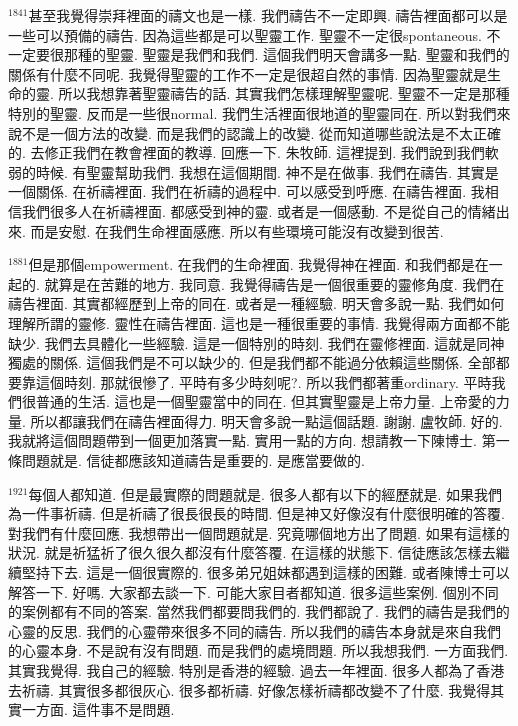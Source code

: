 \documentclass{book}
\begin{document}
$^{1841}$甚至我覺得崇拜裡面的禱文也是一樣.
我們禱告不一定即興.
禱告裡面都可以是一些可以預備的禱告.
因為這些都是可以聖靈工作.
聖靈不一定很spontaneous.
不一定要很那種的聖靈.
聖靈是我們和我們.
這個我們明天會講多一點.
聖靈和我們的關係有什麼不同呢.
我覺得聖靈的工作不一定是很超自然的事情.
因為聖靈就是生命的靈.
所以我想靠著聖靈禱告的話.
其實我們怎樣理解聖靈呢.
聖靈不一定是那種特別的聖靈.
反而是一些很normal.
我們生活裡面很地道的聖靈同在.
所以對我們來說不是一個方法的改變.
而是我們的認識上的改變.
從而知道哪些說法是不太正確的.
去修正我們在教會裡面的教導.
回應一下.
朱牧師.
這裡提到.
我們說到我們軟弱的時候.
有聖靈幫助我們.
我想在這個期間.
神不是在做事.
我們在禱告.
其實是一個關係.
在祈禱裡面.
我們在祈禱的過程中.
可以感受到呼應.
在禱告裡面.
我相信我們很多人在祈禱裡面.
都感受到神的靈.
或者是一個感動.
不是從自己的情緒出來.
而是安慰.
在我們生命裡面感應.
所以有些環境可能沒有改變到很苦.

$^{1881}$但是那個empowerment.
在我們的生命裡面.
我覺得神在裡面.
和我們都是在一起的.
就算是在苦難的地方.
我同意.
我覺得禱告是一個很重要的靈修角度.
我們在禱告裡面.
其實都經歷到上帝的同在.
或者是一種經驗.
明天會多說一點.
我們如何理解所謂的靈修.
靈性在禱告裡面.
這也是一種很重要的事情.
我覺得兩方面都不能缺少.
我們去具體化一些經驗.
這是一個特別的時刻.
我們在靈修裡面.
這就是同神獨處的關係.
這個我們是不可以缺少的.
但是我們都不能過分依賴這些關係.
全部都要靠這個時刻.
那就很慘了.
平時有多少時刻呢?.
所以我們都著重ordinary.
平時我們很普通的生活.
這也是一個聖靈當中的同在.
但其實聖靈是上帝力量.
上帝愛的力量.
所以都讓我們在禱告裡面得力.
明天會多說一點這個話題.
謝謝.
盧牧師.
好的.
我就將這個問題帶到一個更加落實一點.
實用一點的方向.
想請教一下陳博士.
第一條問題就是.
信徒都應該知道禱告是重要的.
是應當要做的.

$^{1921}$每個人都知道.
但是最實際的問題就是.
很多人都有以下的經歷就是.
如果我們為一件事祈禱.
但是祈禱了很長很長的時間.
但是神又好像沒有什麼很明確的答覆.
對我們有什麼回應.
我想帶出一個問題就是.
究竟哪個地方出了問題.
如果有這樣的狀況.
就是祈猛祈了很久很久都沒有什麼答覆.
在這樣的狀態下.
信徒應該怎樣去繼續堅持下去.
這是一個很實際的.
很多弟兄姐妹都遇到這樣的困難.
或者陳博士可以解答一下.
好嗎.
大家都去談一下.
可能大家目者都知道.
很多這些案例.
個別不同的案例都有不同的答案.
當然我們都要問我們的.
我們都說了.
我們的禱告是我們的心靈的反思.
我們的心靈帶來很多不同的禱告.
所以我們的禱告本身就是來自我們的心靈本身.
不是說有沒有問題.
而是我們的處境問題.
所以我想我們.
一方面我們.
其實我覺得.
我自己的經驗.
特別是香港的經驗.
過去一年裡面.
很多人都為了香港去祈禱.
其實很多都很灰心.
很多都祈禱.
好像怎樣祈禱都改變不了什麼.
我覺得其實一方面.
這件事不是問題.
\end{document}
